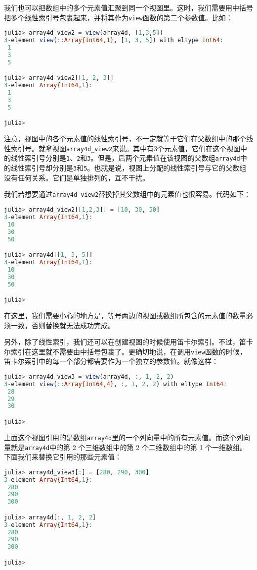 我们也可以把数组中的多个元素值汇聚到同一个视图里。这时，我们需要用中括号把多个线性索引号包裹起来，并将其作为\verb`view`函数的第二个参数值。比如：

\begin{lstlisting}[language=julia]
julia> array4d_view2 = view(array4d, [1,3,5])
3-element view(::Array{Int64,1}, [1, 3, 5]) with eltype Int64:
 1
 3
 5

julia> array4d_view2[[1, 2, 3]]
3-element Array{Int64,1}:
 1
 3
 5

julia> 
\end{lstlisting}

注意，视图中的各个元素值的线性索引号，不一定就等于它们在父数组中的那个线性索引号。就拿视图\verb`array4d_view2`来说。其中有3个元素值，它们在这个视图中的线性索引号分别是\verb`1`、\verb`2`和\verb`3`。但是，后两个元素值在该视图的父数组\verb`array4d`中的线性索引号却分别是\verb`3`和\verb`5`。也就是说，视图上分配的线性索引号与它的父数组没有任何关系。它们是单独排列的，互不干扰。

我们若想要通过\verb`array4d_view2`替换掉其父数组中的元素值也很容易。代码如下：

\begin{lstlisting}[language=julia]
julia> array4d_view2[[1,2,3]] = [10, 30, 50]
3-element Array{Int64,1}:
 10
 30
 50

julia> array4d[[1, 3, 5]]
3-element Array{Int64,1}:
 10
 30
 50

julia> 
\end{lstlisting}

在这里，我们需要小心的地方是，等号两边的视图或数组所包含的元素值的数量必须一致，否则替换就无法成功完成。

另外，除了线性索引，我们还可以在创建视图的时候使用笛卡尔索引。不过，笛卡尔索引在这里就不需要由中括号包裹了。更确切地说，在调用\verb`view`函数的时候，笛卡尔索引中的每一个部分都需要作为一个独立的参数值。就像这样：

\begin{lstlisting}[language=julia]
julia> array4d_view3 = view(array4d, :, 1, 2, 2)
3-element view(::Array{Int64,4}, :, 1, 2, 2) with eltype Int64:
 28
 29
 30

julia>  
\end{lstlisting}

上面这个视图引用的是数组\verb`array4d`里的一个列向量中的所有元素值。而这个列向量就是\verb`array4d`中的第 2 个三维数组中的第 2 个二维数组中的第 1 个一维数组。下面我们来替换它引用的那些元素值：

\begin{lstlisting}[language=julia]
julia> array4d_view3[:] = [280, 290, 300]
3-element Array{Int64,1}:
 280
 290
 300

julia> array4d[:, 1, 2, 2]
3-element Array{Int64,1}:
 280
 290
 300

julia> 
\end{lstlisting}

